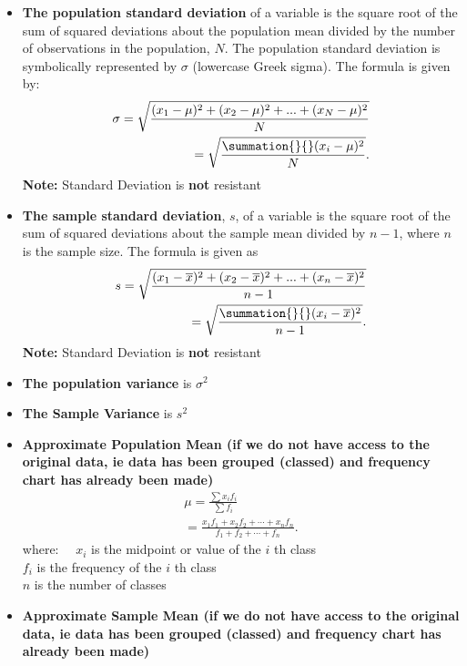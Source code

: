 \documentclass{report}
\begin{document}
\begin{itemize}
            \item \textbf{The population standard deviation} of a variable is the square root of the sum of squared deviations about the population mean divided by the number of observations in the population, $N$. The population standard deviation is symbolically represented by $\sigma$ (lowercase Greek sigma). The formula is given by:
                \begin{align*}
                    \sigma = \sqrt{\frac{(x_{1} - \mu)^{2} + (x_{2}-\mu)^{2}+...+(x_{N}-\mu)^{2}}{N}} \\
                    = \sqrt{\frac{\summation{}{}(x_{i}-\mu)^{2} }{N}}
                .\end{align*}
                \textbf{Note:} Standard Deviation is \textbf{not} resistant
            \item \textbf{The sample standard deviation}, $s $, of a variable is the square root of the sum of squared deviations about the sample mean divided by $n-1 $, where $n$  is the sample size. The formula is given as
                \begin{align*}
                    s = \sqrt{\frac{(x_{1} - \overline{x})^{2}+(x_{2}-\overline{x})^{2}+...+(x_{n}-\overline{x})^{2}}{n-1}}\\
                    = \sqrt{\frac{\summation{}{}(x_{i}-\overline{x})^{2}}{n-1}}
                .\end{align*}
                \textbf{Note:} Standard Deviation is \textbf{not} resistant
            \item  \textbf{The population variance} is \textbf{$\sigma^{2}$} 
            \item \textbf{The Sample Variance} is $s^{2}$
             \item \textbf{Approximate Population Mean (if we do not have access to the original data, ie data has been grouped (classed) and frequency chart has already been made)}
                \begin{align*}
                    \mu =\frac{\sum x_i f_i}{\sum f_i} \\
                     =\frac{x_1 f_1+x_2 f_2+\cdots+x_n f_n}{f_1+f_2+\cdots+f_n}
                .\end{align*}
            where: $\quad x_i$ is the midpoint or value of the $i$ th class  \\
            $f_i$ is the frequency of the $i$ th class  \\
            $n$ is the number of classes
            \item \textbf{Approximate Sample Mean (if we do not have access to the original data, ie data has been grouped (classed) and frequency chart has already been made)}

\end{itemize}
\end{document}
